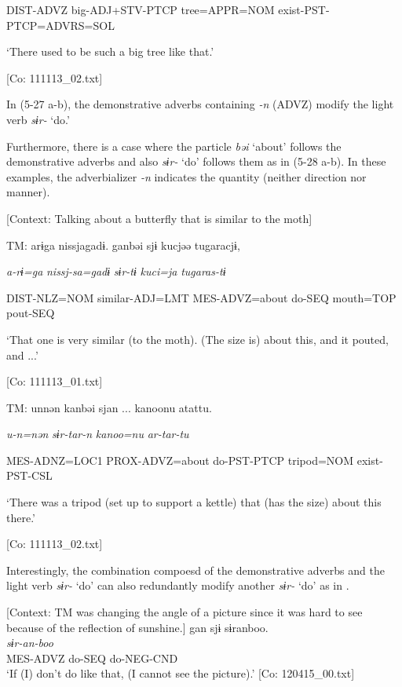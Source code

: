       DIST-ADVZ  big-ADJ+STV-PTCP  tree=APPR=NOM exist-PST-PTCP=ADVRS=SOL

      ‘There used to be such a big tree like that.’

      [Co: 111113\_02.txt]
\z
\z

In (5-27 a-b), the demonstrative adverbs containing \textit{{}-n} (ADVZ) modify the light verb \textit{sɨr-} ‘do.’

Furthermore, there is a case where the particle \textit{bəi} ‘about’ follows the demonstrative adverbs and also \textit{sɨr-} ‘do’ follows them as in (5-28 a-b). In these examples, the adverbializer \textit{{}-n} indicates the quantity (neither direction nor manner).

\ea \label{ex:5:28}  \ea \label{ex:5:28a} [Context: Talking about a butterfly that is similar to the moth]

    TM:  arɨga  nissjagadɨ.  ganbəi  sjɨ  kucjəə  tugaracjɨ,

      \textit{a-rɨ=ga}  \textit{nissj-sa=gadɨ}  \textit{}  \textit{sɨr-tɨ}  \textit{kuci=ja}  \textit{tugaras-tɨ}
                                                                                   
      DIST-NLZ=NOM  similar-ADJ=LMT  MES-ADVZ=about  do-SEQ     mouth=TOP  pout-SEQ

      ‘That one is very similar (to the moth). (The size is) about this, and it pouted, and ...’

      [Co: 111113\_01.txt]

 \ex \label{ex:5:b} TM:  unnən  kanbəi  sjan  ...   kanoonu  atattu.    
                                                               
      \textit{u-n=nən}  \textit{}  \textit{sɨr-tar-n} \textit{kanoo=nu}  \textit{ar-tar-tu}     
                                                              
      MES-ADNZ=LOC1  PROX-ADVZ=about  do-PST-PTCP   tripod=NOM  exist-PST-CSL    

      ‘There was a tripod (set up to support a kettle) that (has the size) about this there.’

      [Co: 111113\_02.txt]
\z
\z

Interestingly, the combination compoesd of the demonstrative adverbs and the light verb \textit{sɨr-} ‘do’ can also redundantly modify another \textit{sɨr-} ‘do’ as in .

\ea \label{ex:5:29}   [Context: TM was changing the angle of a picture since it was hard to see because of the reflection of sunshine.]
\glll  gan  sjɨ  sɨranboo.\\
\textit{}  \textit{}  \textit{sɨr-an-boo}\\
MES-ADVZ  do-SEQ  do-NEG-CND\\
\glt ‘If (I) don’t do like that, (I cannot see the picture).’ [Co: 120415\_00.txt]
\z

